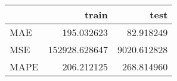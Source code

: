 \begin{tabular}{lrr}
\toprule
{} &          train &         test \\
\midrule
MAE  &     195.032623 &    82.918249 \\
MSE  &  152928.628647 &  9020.612828 \\
MAPE &     206.212125 &   268.814960 \\
\bottomrule
\end{tabular}
